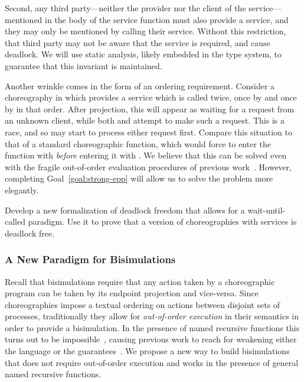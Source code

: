 Second, any third party---neither the provider nor the client of the service---mentioned in the body of the service function must also provide a service, and they may only be mentioned by calling their service.
Without this restriction, that third party may not be aware that the service is required, and cause deadlock.
We will use static analysis, likely embedded in the type system, to guarantee that this invariant is maintained.

Another wrinkle comes in the form of an ordering requirement.
Consider a choreography in which \Alice{} provides a service which is called twice, once by \Bob{} and once by \Cathy{} in that order.
After projection, this will appear as \Alice{} waiting for a request from an unknown client, while both \Bob{} and \Cathy{} attempt to make such a request.
This is a race, and so \Alice{} may start to process either request first.
Compare this situation to that of a standard choreographic function, which would force \Alice{} to enter the function with \Bob{} \emph{before} entering it with \Cathy{}.
We believe that this can be solved even with the fragile out-of-order evaluation procedures of previous work~\cite{CruzFilipeGLMP23,Montesi23,HirschG22}.
However, completing Goal~\ref{goal:strong-epp} will allow us to solve the problem more elegantly.

\begin{goal}
  \label{goal:wait-until-called}
  Develop a new formalization of deadlock freedom that allows for a wait-until-called paradigm.
  Use it to prove that a version of choreographies with services is deadlock free.
\end{goal}

\subsubsection{A New Paradigm for Bisimulations}
\label{sec:new-parad-bisim}

Recall that bisimulations require that any action taken by a choreographic program can be taken by its endpoint projection and vice-versa.
Since choreographies impose a textual ordering on actions between disjoint sets of processes, traditionally they allow for \emph{out-of-order execution} in their semantics in order to provide a bisimulation.
In the presence of named recursive functions this turns out to be impossible~\cite{SamuelsonHC25}, causing previous work to reach for weakening either the language or the guarantees~\cite{HirschG22,CruzFilipeGLMP22,SamuelsonHC25}.
We propose a new way to build bisimulations that does not require out-of-order execution and works in the presence of general named recursive functions.

